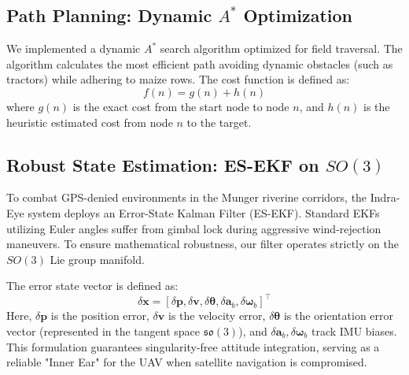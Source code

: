 \documentclass[12pt]{article}
\begin{document}
\subsection{Path Planning: Dynamic $A^*$ Optimization}
We implemented a dynamic $A^*$ search algorithm optimized for field traversal. The algorithm calculates the most efficient path avoiding dynamic obstacles (such as tractors) while adhering to maize rows. The cost function is defined as:
\begin{equation}
    f(n) = g(n) + h(n)
\end{equation}
where $g(n)$ is the exact cost from the start node to node $n$, and $h(n)$ is the heuristic estimated cost from node $n$ to the target.

\subsection{Robust State Estimation: ES-EKF on $SO(3)$}
To combat GPS-denied environments in the Munger riverine corridors, the Indra-Eye system deploys an Error-State Kalman Filter (ES-EKF). Standard EKFs utilizing Euler angles suffer from gimbal lock during aggressive wind-rejection maneuvers. To ensure mathematical robustness, our filter operates strictly on the $SO(3)$ Lie group manifold.

The error state vector is defined as:
\begin{equation}
    \delta \mathbf{x} = [\delta \mathbf{p}, \delta \mathbf{v}, \delta \boldsymbol{\theta}, \delta \mathbf{a}_b, \delta \boldsymbol{\omega}_b]^\top
\end{equation}
Here, $\delta \mathbf{p}$ is the position error, $\delta \mathbf{v}$ is the velocity error, $\delta \boldsymbol{\theta}$ is the orientation error vector (represented in the tangent space $\mathfrak{so}(3)$), and $\delta \mathbf{a}_b, \delta \boldsymbol{\omega}_b$ track IMU biases. This formulation guarantees singularity-free attitude integration, serving as a reliable "Inner Ear" for the UAV when satellite navigation is compromised.
\end{document}
